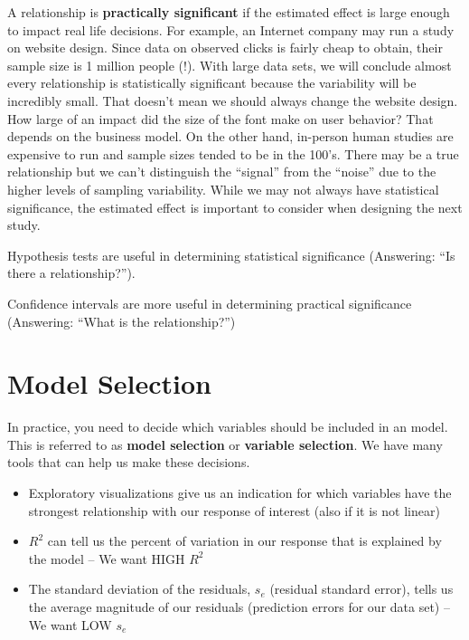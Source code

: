 \documentclass[]{book}
\providecommand{\tightlist}{%
  \setlength{\itemsep}{0pt}\setlength{\parskip}{0pt}}
\begin{document}
A relationship is \textbf{practically significant} if the estimated effect is large enough to impact real life decisions. For example, an Internet company may run a study on website design. Since data on observed clicks is fairly cheap to obtain, their sample size is 1 million people (!). With large data sets, we will conclude almost every relationship is statistically significant because the variability will be incredibly small. That doesn't mean we should always change the website design. How large of an impact did the size of the font make on user behavior? That depends on the business model. On the other hand, in-person human studies are expensive to run and sample sizes tended to be in the 100's. There may be a true relationship but we can't distinguish the ``signal'' from the ``noise'' due to the higher levels of sampling variability. While we may not always have statistical significance, the estimated effect is important to consider when designing the next study.

Hypothesis tests are useful in determining statistical significance (Answering: ``Is there a relationship?'').

Confidence intervals are more useful in determining practical significance (Answering: ``What is the relationship?'')

\hypertarget{model-selection}{%
\section{Model Selection}\label{model-selection}}

In practice, you need to decide which variables should be included in an model. This is referred to as \textbf{model selection} or \textbf{variable selection}. We have many tools that can help us make these decisions.

\begin{itemize}
\tightlist
\item
  Exploratory visualizations give us an indication for which variables have the strongest relationship with our response of interest (also if it is not linear)
\item
  \(R^2\) can tell us the percent of variation in our response that is explained by the model -- We want HIGH \(R^2\)
\item
  The standard deviation of the residuals, \(s_e\) (residual standard error), tells us the average magnitude of our residuals (prediction errors for our data set) -- We want LOW \(s_e\)
\end{itemize}
\end{document}

